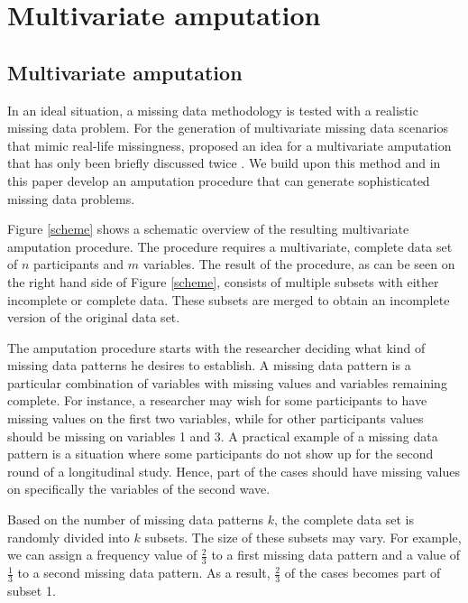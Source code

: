 \documentclass[11pt,a4paper]{article}
\begin{document}
\section{Multivariate amputation}

\subsection{\normalsize Multivariate amputation}\label{method}

In an ideal situation, a missing data methodology is tested with a realistic missing data problem. For the generation of multivariate missing data scenarios that mimic real-life missingness, \citet[][pp. 110 - 113]{Jaap1999} proposed an idea for a multivariate amputation that has only been briefly discussed twice \citep{Stef2006, Jaap2003}. We build upon this method and in this paper develop an amputation procedure that can generate sophisticated missing data problems. 

Figure \ref{scheme} shows a schematic overview of the resulting  multivariate amputation procedure. The procedure requires a multivariate, complete data set of $n$ participants and $m$ variables. The result of the procedure, as can be seen on the right hand side of Figure \ref{scheme}, consists of multiple subsets with either incomplete or complete data. These subsets are merged to obtain an incomplete version of the original data set. 

The amputation procedure starts with the researcher deciding what kind of missing data patterns he desires to establish. A missing data pattern is a particular combination of variables with missing values and variables remaining complete. For instance, a researcher may wish for some participants to have missing values on the first two variables, while for other participants values should be missing on variables 1 and 3. A practical example of a missing data pattern is a situation where some participants do not show up for the second round of a longitudinal study. Hence, part of the cases should have missing values on specifically the variables of the second wave. 

Based on the number of missing data patterns $k$, the complete data set is randomly divided into $k$ subsets. The size of these subsets may vary. For example, we can assign a frequency value of $\frac{2}{3}$ to a first missing data pattern and a value of $\frac{1}{3}$ to a second missing data pattern. As a result, $\frac{2}{3}$ of the cases becomes part of subset 1. 
\end{document}
